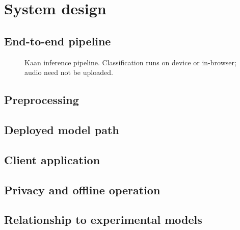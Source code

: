 \section{System design}
\label{sec:system}

\subsection{End-to-end pipeline}

\begin{figure}[H]
\centering
\caption{Kaan inference pipeline. Classification runs on device or in-browser; audio need not be uploaded.}
\label{fig:pipeline}
\end{figure}

\subsection{Preprocessing}

\subsection{Deployed model path}

\subsection{Client application}

\subsection{Privacy and offline operation}

\subsection{Relationship to experimental models}
